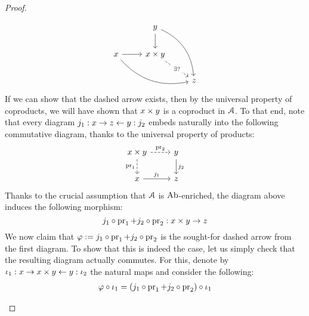 \begin{proof}
\begin{enumerate}
                                    $$
                                        \begin{tikzcd}
                                                                                                    & y \arrow[d] \arrow[rdd, bend left] &   \\
                                            x \arrow[r] \arrow[rrd, bend right] & x \x y \arrow[rd, "\exists ?" description, dashed]   &   \\
                                                                                                    &                                                      & z
                                        \end{tikzcd}
                                    $$
                                If we can show that the dashed arrow exists, then by the universal property of coproducts, we will have shown that $x \x y$ is a coproduct in $\calA$. To that end, note that every diagram $j_1: x \to z \ot y: j_2$ embeds naturally into the following commutative diagram, thanks to the universal property of products:
                                    $$
                                        \begin{tikzcd}
                                            x \x y \arrow[d, "\pr_1"', dashed] \arrow[r, "\pr_2", dashed] & y \arrow[d, "j_2"] \\
                                            x \arrow[r, "j_1"]                                            & z                 
                                        \end{tikzcd}
                                    $$
                                Thanks to the crucial assumption that $\calA$ is $\Ab$-enriched, the diagram above induces the following morphism:
                                    $$j_1 \circ \pr_1 + j_2 \circ \pr_2: x \x y \to z$$
                                We now claim that $\varphi := j_1 \circ \pr_1 + j_2 \circ \pr_2$ is the sought-for dashed arrow from the first diagram. To show that this is indeed the case, let us simply check that the resulting diagram actually commutes. For this, denote by $\iota_1: x \to x \x y \ot y: \iota_2$ the natural maps and consider the following:
                                    $$
                                        \begin{aligned}
                                            \varphi \circ \iota_1 & = (j_1 \circ \pr_1 + j_2 \circ \pr_2) \circ \iota_1
                                            \\

\end{aligned}$$
\end{enumerate}
\end{proof}
